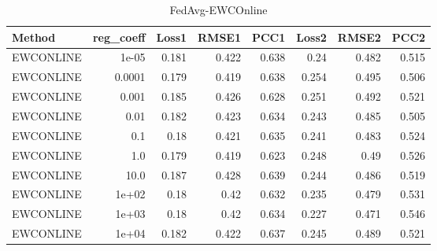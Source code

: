 \begin{table}
\caption{FedAvg-EWCOnline}
\begin{tabular}{lrrrrrrr}
\toprule
Method & reg_coeff & Loss1 & RMSE1 & PCC1 & Loss2 & RMSE2 & PCC2 \\
\midrule
EWCONLINE & 1e-05 & 0.181 & 0.422 & 0.638 & 0.24 & 0.482 & 0.515 \\
EWCONLINE & 0.0001 & 0.179 & 0.419 & 0.638 & 0.254 & 0.495 & 0.506 \\
EWCONLINE & 0.001 & 0.185 & 0.426 & 0.628 & 0.251 & 0.492 & 0.521 \\
EWCONLINE & 0.01 & 0.182 & 0.423 & 0.634 & 0.243 & 0.485 & 0.505 \\
EWCONLINE & 0.1 & 0.18 & 0.421 & 0.635 & 0.241 & 0.483 & 0.524 \\
EWCONLINE & 1.0 & 0.179 & 0.419 & 0.623 & 0.248 & 0.49 & 0.526 \\
EWCONLINE & 10.0 & 0.187 & 0.428 & 0.639 & 0.244 & 0.486 & 0.519 \\
EWCONLINE & 1e+02 & 0.18 & 0.42 & 0.632 & 0.235 & 0.479 & 0.531 \\
EWCONLINE & 1e+03 & 0.18 & 0.42 & 0.634 & 0.227 & 0.471 & 0.546 \\
EWCONLINE & 1e+04 & 0.182 & 0.422 & 0.637 & 0.245 & 0.489 & 0.521 \\
\bottomrule
\end{tabular}
\end{table}
